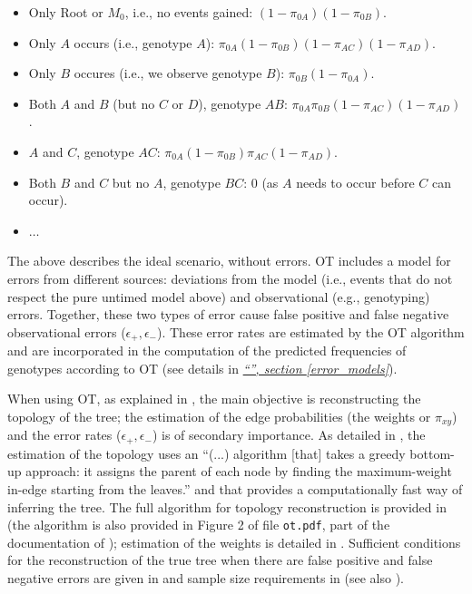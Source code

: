 \documentclass[a4paper,11pt]{article}
\newcommand*{\qrefP}[1]{\hyperref[{#1}]{\textit{``\nameref*{#1}'', section \ref*{#1}}}}
\begin{document}
\begin{itemize}
\item Only Root or $M_0$, i.e., no events gained: $(1 - \pi_{0A}) (1 - \pi_{0B})$.
\item Only $A$ occurs (i.e., genotype $A$): $\pi_{0A}(1 - \pi_{0B}) (1 - \pi_{AC}) (1 - \pi_{AD}) $.
\item Only $B$ occures (i.e., we observe genotype $B$): $\pi_{0B}(1 - \pi_{0A})$.
\item Both $A$ and $B$ (but no $C$ or $D$), genotype $AB$: $\pi_{0A} \pi_{0B} (1 - \pi_{AC}) (1 - \pi_{AD})$.
\item $A$ and $C$, genotype $AC$: $\pi_{0A} (1 - \pi_{0B}) \pi_{AC} (1 - \pi_{AD})$.
\item Both $B$ and $C$ but no $A$, genotype $BC$: 0 (as $A$ needs to occur before $C$ can occur).
\item $\ldots$
\end{itemize}



The above describes the ideal scenario, without errors. OT includes a model for errors from different sources: deviations from the model (i.e., events that do not respect the pure untimed model above) and observational (e.g., genotyping) errors. Together, these two types of error cause false positive and false negative observational errors ($\epsilon_+, \epsilon_-$). These error rates are estimated by the OT algorithm and are incorporated in the computation of the predicted frequencies of genotypes according to OT (see details in \qrefP{error_models}).


When using OT, as explained in \citet[p.~5][]{Szabo2008}, the main objective is reconstructing the topology of the tree; the estimation of the edge probabilities (the weights or $\pi_{xy}$) and the error rates ($\epsilon_+, \epsilon_-$) is of secondary importance. As detailed in \citet[p.~5]{Szabo2008}, the estimation of the topology uses an ``(...) algorithm [that] takes a greedy bottom-up approach: it assigns the parent of each node by finding the maximum-weight in-edge starting from the leaves.'' and that provides a computationally fast way of inferring the tree. The full algorithm for topology reconstruction is provided in \citet[Section 3 and Fig.~2]{Szabo2008} (the algorithm is also provided in Figure 2 of file \texttt{ot.pdf}, part of the documentation of \citealp{OTpackage}); estimation of the weights is detailed in \citet[p.~13]{Szabo2008}. Sufficient conditions for the reconstruction of the true tree when there are false positive and false negative errors are given in \citet{Szabo2002} and sample size requirements in \citet[p.~8]{Szabo2008}(see also \citealp{desper1999inferring}).
\end{document}
